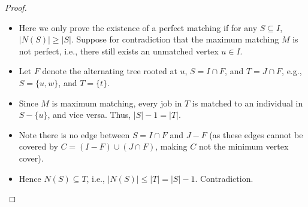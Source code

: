 \documentclass[mathserif]{beamer}
\begin{document}
{\begin{proof}
	\begin{itemize}
		\item Here we only prove the existence of a perfect matching if for any $S\subseteq I$, $|N(S)| \geq |S|$.  
		 Suppose  for contradiction that the maximum matching $M$ is not perfect, i.e., there still exists an unmatched vertex $u  \in I$. 
		\item Let $F$ denote the alternating tree rooted at $u$, $S=I\cap F$, and $T=J\cap F$, e.g., $S=\{u, w\}$, and $T=\{t\}$.  
		\item Since $M$ is maximum matching,  every job in $T$ is matched to an individual in $S-\{u\}$, and vice versa. Thus, $|S|-1=|T|$. 
		\item Note there is no edge between $S=I\cap F$ and $J - F$ (as these edges cannot be covered by $C=(I-F) \cup (J\cap F)$, making $C$ not the minimum vertex cover). 
		\item Hence $N(S)\subseteq T$, i.e., $|N(S)| \leq |T| = |S|-1$.  Contradiction. 
	\end{itemize}

\end{proof}
	
}



\end{document}
